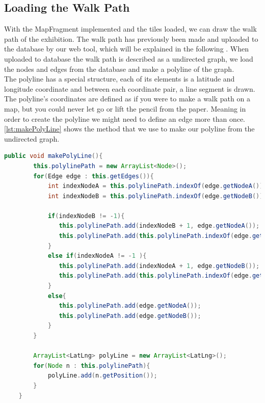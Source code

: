 \subsection*{Loading the Walk Path}
With the MapFragment implemented and the tiles loaded, we can draw the walk path of the exhibition. The walk path has previously been made and uploaded to the database by our web tool, which will be explained in the following . When uploaded to database the walk path is described as a undirected graph, we load the nodes and edges from the database and make a polyline of the graph.\\ 
The polyline has a special structure, each of its elements is a latitude and longitude coordinate and between each coordinate pair, a line segment is drawn. The polyline's coordinates are defined as if you were to make a walk path on a map, but you could never let go or lift the pencil from the paper. Meaning in order to create the polyline we might need to define an edge more than once. \autoref{lst:makePolyLine} shows the method that we use to make our polyline from the undirected graph.
\begin{lstlisting}[language=java, label=lst:makePolyLine, caption=makePolyLine]
public void makePolyLine(){
        this.polylinePath = new ArrayList<Node>();
        for(Edge edge : this.getEdges()){
            int indexNodeA = this.polylinePath.indexOf(edge.getNodeA());
            int indexNodeB = this.polylinePath.indexOf(edge.getNodeB());
            
            if(indexNodeB != -1){
               this.polylinePath.add(indexNodeB + 1, edge.getNodeA());
               this.polylinePath.add(this.polylinePath.indexOf(edge.getNodeA())+1, edge.getNodeB());
            }
            else if(indexNodeA != -1 ){
               this.polylinePath.add(indexNodeA + 1, edge.getNodeB());
               this.polylinePath.add(this.polylinePath.indexOf(edge.getNodeB())+1, edge.getNodeA());
            }
            else{
               this.polylinePath.add(edge.getNodeA());
               this.polylinePath.add(edge.getNodeB());
            }
        }

        ArrayList<LatLng> polyLine = new ArrayList<LatLng>();
        for(Node n : this.polylinePath){
            polyLine.add(n.getPosition());
        }
    }
\end{lstlisting}
